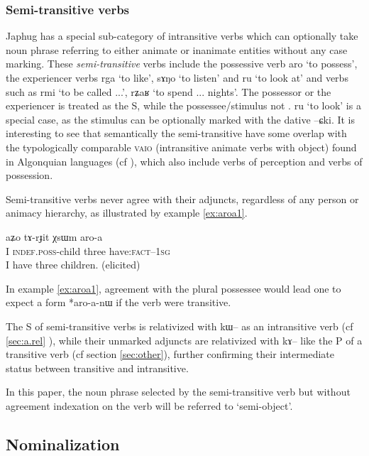 \documentclass[oldfontcommands,oneside,a4paper,11pt]{article}
\newcommand{\ipa}[1]{{\phon #1}} %
\begin{document}
   
   
\subsubsection{Semi-transitive verbs} \label{sec:semi.tr}
  Japhug has a special sub-category of intransitive verbs which can optionally take  noun phrase referring to either animate or inanimate entities without any case marking.   These  \textit{semi-transitive} verbs   include the possessive verb \ipa{aro} `to possess', the experiencer verbs \ipa{rga} `to like', \ipa{sɤŋo} `to listen' and \ipa{ru} `to look at' and verbs such as \ipa{rmi} `to be called ...', \ipa{rʑaʁ} `to spend ... nights'. The possessor or the experiencer is treated as the S, while the possessee/stimulus not . \ipa{ru} `to look' is a special case, as the stimulus can be optionally marked with the dative \ipa{--ɕki}. It is interesting to see that semantically the semi-transitive have some overlap with the typologically  comparable \textsc{vaio} (intransitive animate verbs with object) found in Algonquian languages (cf  \citealt[242]{valentine01grammar}), which also include verbs of perception and verbs of possession.

Semi-transitive verbs never agree with their adjuncts, regardless of any person or animacy hierarchy, as illustrated by example \ref{ex:aroa1}.


 \begin{exe}
   \ex   \label{ex:aroa1}
 \gll 
\ipa{aʑo}  	\ipa{tɤ-rɟit}  	\ipa{χsɯm}  	\ipa{aro-a}   \\
I \textsc{indef.poss}-child three have:\textsc{fact}--\textsc{1sg} \\
 \glt   I have three children. (elicited)
   \end{exe} 

 
In example \ref{ex:aroa1}, agreement with the plural possessee would lead one to expect a form *\ipa{aro-a-nɯ} if the verb were transitive.

The S of semi-transitive verbs is relativized with \ipa{kɯ}-- as an intransitive verb (cf  \ref{sec:a.rel} ), while their unmarked adjuncts are relativized with \ipa{kɤ--} like the P of a transitive verb (cf section \ref{sec:other}), further confirming their intermediate status between transitive and intransitive.

In this paper, the noun phrase selected by the semi-transitive verb but without agreement indexation on the verb will be referred to `semi-object'.

\subsection{Nominalization} \label{sec:nmlz}
\end{document}
